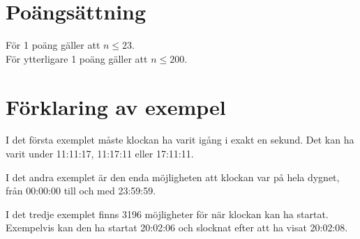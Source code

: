 \section*{Poängsättning}
För 1 poäng gäller att $n \le 23$. \\
För ytterligare 1 poäng gäller att $n \le 200$.

\section*{Förklaring av exempel}
I det första exemplet måste klockan ha varit igång i exakt en sekund. Det kan ha varit under 11:11:17, 11:17:11 eller 17:11:11.

I det andra exemplet är den enda möjligheten att klockan var på hela dygnet, från 00:00:00 till och med 23:59:59.

I det tredje exemplet finns 3196 möjligheter för när klockan kan ha startat. Exempelvis kan den ha startat 20:02:06 och slocknat efter att ha visat 20:02:08.
